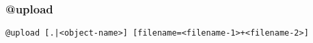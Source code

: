 \subsubsection{@upload}
\label{upload}

\begin{verbatim}
@upload [.|<object-name>] [filename=<filename-1>+<filename-2>]
\end{verbatim}